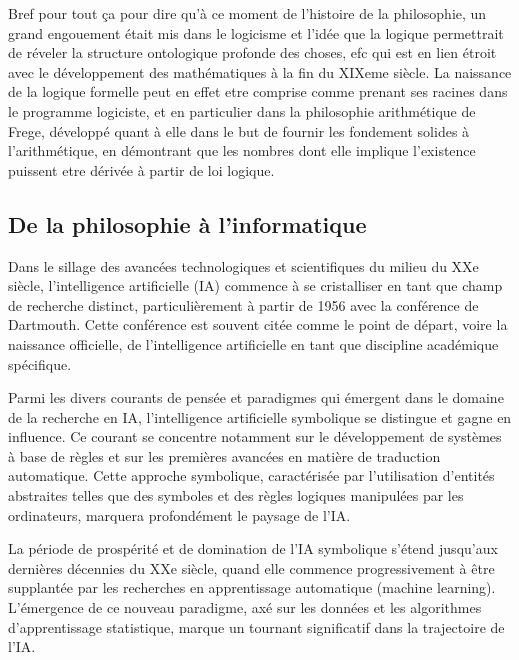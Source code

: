 \documentclass[12pt]{report}
\begin{document}
Bref pour tout ça pour dire qu'à ce moment de l'histoire de la philosophie, un grand engouement était mis dans le logicisme et l'idée que la logique permettrait de réveler la structure ontologique profonde des choses, efc qui est en lien étroit avec le développement des mathématiques à la fin du XIXeme siècle. La naissance de la logique formelle peut en effet etre comprise comme prenant ses racines dans le programme logiciste, et en particulier dans la philosophie arithmétique de Frege, développé quant à elle dans le but de fournir les fondement solides à l'arithmétique, en démontrant que les nombres dont elle implique l'existence puissent etre dérivée à partir de loi logique. 

\subsection{De la philosophie à l'informatique}

Dans le sillage des avancées technologiques et scientifiques du milieu du XXe siècle, l'intelligence artificielle (IA) commence à se cristalliser en tant que champ de recherche distinct, particulièrement à partir de 1956 avec la conférence de Dartmouth. Cette conférence est souvent citée comme le point de départ, voire la naissance officielle, de l'intelligence artificielle en tant que discipline académique spécifique.

Parmi les divers courants de pensée et paradigmes qui émergent dans le domaine de la recherche en IA, l'intelligence artificielle symbolique se distingue et gagne en influence. Ce courant se concentre notamment sur le développement de systèmes à base de règles et sur les premières avancées en matière de traduction automatique. Cette approche symbolique, caractérisée par l'utilisation d'entités abstraites telles que des symboles et des règles logiques manipulées par les ordinateurs, marquera profondément le paysage de l'IA.

La période de prospérité et de domination de l'IA symbolique s'étend jusqu'aux dernières décennies du XXe siècle, quand elle commence progressivement à être supplantée par les recherches en apprentissage automatique (machine learning). L'émergence de ce nouveau paradigme, axé sur les données et les algorithmes d'apprentissage statistique, marque un tournant significatif dans la trajectoire de l'IA.
\end{document}
